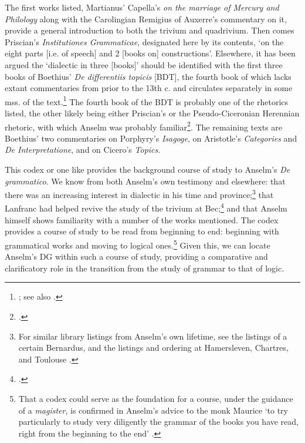 \documentclass[]{article}
\begin{document}
The first works listed, Martianus' Capella's \textit{on the marriage of Mercury and Philology} along with the Carolingian Remigius of Auxerre's commentary on it, provide a general introduction to both the trivium and quadrivium. Then comes Priscian's \textit{Institutiones Grammaticae}, designated here by its contents, `on the eight parts [i.e. of speech] and 2 [books on] constructions'. Elsewhere, it has been argued the `dialectic in three [books]' should be identified with the first three books of Boethius' \textit{De differentiis topicis} [BDT], the fourth book of which lacks extant commentaries from prior to the 13th c. and circulates separately in some mss. of the text.\footnote{\cite{Archambault2017}; see also \cite[p. 124]{Green-Pedersen1984}.} The fourth book of the BDT is probably one of the rhetorics listed, the other likely being either Priscian's or the Pseudo-Ciceronian Herennian rhetoric, with which Anselm was probably familiar\footnote{\cite[p. 87]{Henry1974}.}. The remaining texts are Boethius' two commentaries on Porphyry's \textit{Isagoge}, on Aristotle's \textit{Categories} and \textit{De Interpretatione}, and on Cicero's \textit{Topics}.

This codex or one like provides the background course of study to Anselm's \textit{De grammatico}. We know from both Anselm's own testimony and elsewhere: that there was an increasing interest in dialectic in his time and province;\footnote{For similar library listings from Anselm's own lifetime, see the listings of a certain Bernardus, and the listings and ordering at Hamersleven, Chartres, and Toulouse \cite[pp. 138, 140, 144-145, 153]{Bekker1885}.} that Lanfranc had helped revive the study of the trivium at Bec;\footnote{\cite[pp. 14]{Southern1963}.} and that Anselm himself shows familiarity with a number of the works mentioned. The codex provides a course of study to be read from beginning to end: beginning with grammatical works and moving to logical ones.\footnote{That a codex could serve as the foundation for a course, under the guidance of a \textit{magister}, is confirmed in Anselm's advice to the monk Maurice `to try particularly to study very diligently the grammar of the books you have read, right from the beginning to the end' \cite[Ep. 64, p. 180]{Anselm1990}.} Given this, we can locate Anselm's DG within such a course of study, providing a comparative and clarificatory role in the transition from the study of grammar to that of logic.
\end{document}
